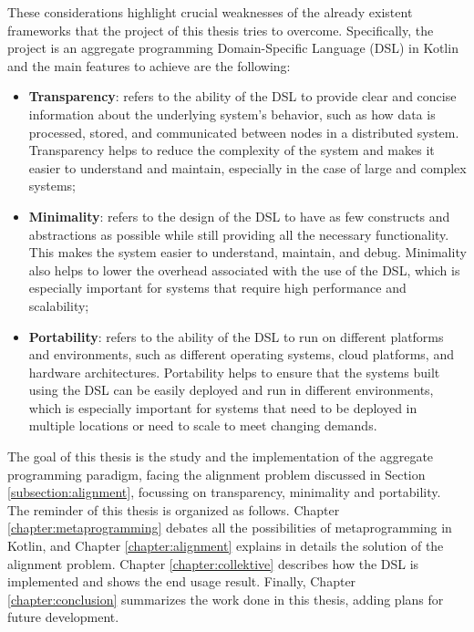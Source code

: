 These considerations highlight crucial weaknesses of the already existent frameworks that the project of this thesis tries to overcome. Specifically, the project is an aggregate programming Domain-Specific Language (DSL) in Kotlin and the main features to achieve are the following:
\begin{itemize}
    \item \textbf{Transparency}: refers to the ability of the DSL to provide clear and concise information about the underlying system's behavior, such as how data is processed, stored, and communicated between nodes in a distributed system. Transparency helps to reduce the complexity of the system and makes it easier to understand and maintain, especially in the case of large and complex systems;
    \item \textbf{Minimality}: refers to the design of the DSL to have as few constructs and abstractions as possible while still providing all the necessary functionality. This makes the system easier to understand, maintain, and debug. Minimality also helps to lower the overhead associated with the use of the DSL, which is especially important for systems that require high performance and scalability;
    \item \textbf{Portability}: refers to the ability of the DSL to run on different platforms and environments, such as different operating systems, cloud platforms, and hardware architectures. Portability helps to ensure that the systems built using the DSL can be easily deployed and run in different environments, which is especially important for systems that need to be deployed in multiple locations or need to scale to meet changing demands.
\end{itemize}

The goal of this thesis is the study and the implementation of the aggregate programming paradigm, facing the alignment problem discussed in Section \ref{subsection:alignment}, focussing on transparency, minimality and portability.\newline
The reminder of this thesis is organized as follows. Chapter \ref{chapter:metaprogramming} debates all the possibilities of metaprogramming in Kotlin, and Chapter \ref{chapter:alignment} explains in details the solution of the alignment problem. Chapter \ref{chapter:collektive} describes how the DSL is implemented and shows the end usage result. Finally, Chapter \ref{chapter:conclusion} summarizes the work done in this thesis, adding plans for future development.
